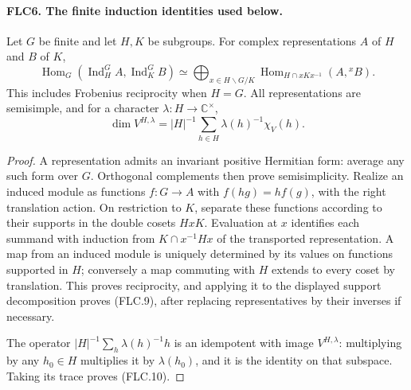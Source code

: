 \paragraph{FLC6. The finite induction identities used below.}
\label{claim:FLC6}
Let $G$ be finite and let $H,K$ be subgroups.  For complex
representations $A$ of $H$ and $B$ of $K$,
\[
 \operatorname{Hom}_G(\operatorname{Ind}_H^G A,
                          \operatorname{Ind}_K^G B)
 \simeq\bigoplus_{x\in H\backslash G/K}
 \operatorname{Hom}_{H\cap xKx^{-1}}(A,{}^xB).
 \tag{FLC.9}
\]
This includes Frobenius reciprocity when $H=G$.
All representations are semisimple, and for a character
$\lambda:H\to\mathbb C^\times$,
\[
 \dim V^{H,\lambda}
       =|H|^{-1}\sum_{h\in H}\lambda(h)^{-1}\chi_V(h).
 \tag{FLC.10}
\]
\begin{proof}
A representation admits an invariant positive Hermitian form:
average any such form over $G$.  Orthogonal complements then
prove semisimplicity.  Realize an induced module as functions
$f:G\to A$ with $f(hg)=h f(g)$, with the right translation
action.  On restriction to $K$, separate these functions
according to their supports in the double cosets $HxK$.
Evaluation at $x$ identifies each summand with induction from
$K\cap x^{-1}Hx$ of the transported representation.  A map
from an induced module is uniquely determined by its values
on functions supported in $H$; conversely a map commuting with
$H$ extends to every coset by translation.  This proves
reciprocity, and applying it to the displayed support
decomposition proves (FLC.9), after replacing representatives
by their inverses if necessary.

The operator $|H|^{-1}\sum_h\lambda(h)^{-1}h$ is an idempotent
with image $V^{H,\lambda}$: multiplying by any $h_0\in H$
multiplies it by $\lambda(h_0)$, and it is the identity on that
subspace.  Taking its trace proves (FLC.10).
\end{proof}

